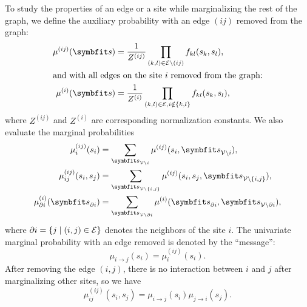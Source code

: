 To study the properties of an edge or a site while marginalizing the rest of the graph, we define the auxiliary probability with an edge $(i j)$ removed from the graph:
\begin{align}
\mu^{(i j)}(\vs) &= \frac{1}{Z^{(i j)}} \prod_{(k, l) \in \calE \setminus (i j)} f_{k l}(s_k, s_l), \\
\shortintertext{and with all edges on the site $i$ removed from the graph:}
\mu^{(i)}(\vs) &= \frac{1}{Z^{(i)}} \prod_{(k, l) \in \calE, i \notin \{k, l\}} f_{k l}(s_k, s_l),
\end{align}
where $Z^{(i j)}$ and $Z^{(i)}$ are corresponding normalization constants. We also evaluate the marginal probabilities
\begin{align}
\mu^{(i j)}_i(s_i) &= \sum_{\vs_{\calV \setminus i}} \mu^{(i j)}(s_i, \vs_{\calV \setminus i}), \\
\mu^{(i j)}_{i j}(s_i, s_j) &= \sum_{\vs_{\calV \setminus \{i, j\}}} \mu^{(i j)}(s_i, s_j, \vs_{\calV \setminus \{i, j\}}), \\
\mu^{(i)}_{\partial i}(\vs_{\partial i}) &= \sum_{\vs_{\calV \setminus \partial i}} \mu^{(i)}(\vs_{\partial i}, \vs_{\calV \setminus \partial i}),
\end{align}
where $\partial i = \left\{ j \mid (i, j) \in \mathcal{E} \right\}$ denotes the neighbors of the site $i$. The univariate marginal probability with an edge removed is denoted by the ``message'':
\begin{equation}
\mu_{i \to j}(s_i) = \mu^{(i j)}_i(s_i).
\end{equation}
After removing the edge $(i, j)$, there is no interaction between $i$ and $j$ after marginalizing other sites, so we have
\begin{equation}
\mu^{(i j)}_{i j}(s_i, s_j) = \mu_{i \to j}(s_i) \mu_{j \to i}(s_j).
\end{equation}


